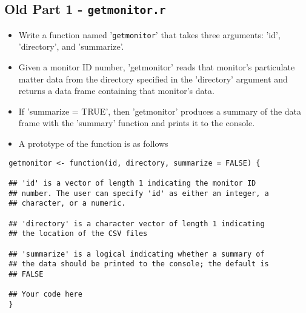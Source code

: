 \documentclass[]{article}
\begin{document}
\subsection{Old Part 1 - \texttt{getmonitor.r}}
 \begin{itemize}
\item Write a function named '\texttt{getmonitor}' that takes three arguments: 'id', 'directory', and 'summarize'. \item Given a monitor ID number, 'getmonitor' reads that monitor's particulate matter data from the directory specified in the 'directory' argument and returns a data frame containing that monitor's data. 
 \item If 'summarize = TRUE', then 'getmonitor' produces a summary of the data frame with the 'summary' function and prints it to the console. \item A prototype of the function is as follows
 \end{itemize}
 \begin{framed}
 \begin{verbatim}
 getmonitor <- function(id, directory, summarize = FALSE) {
 
 ## 'id' is a vector of length 1 indicating the monitor ID
 ## number. The user can specify 'id' as either an integer, a
 ## character, or a numeric.
         
 ## 'directory' is a character vector of length 1 indicating
 ## the location of the CSV files
 
 ## 'summarize' is a logical indicating whether a summary of
 ## the data should be printed to the console; the default is
 ## FALSE
      
 ## Your code here
 }
 \end{verbatim}
 \end{framed}
 \newpage
\end{document}
